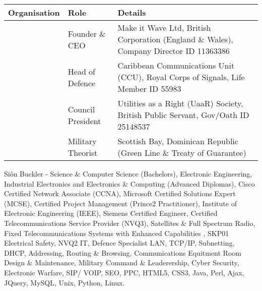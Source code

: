 \documentclass[letterpaper,10pt,openany,oneside,english]{sphinxmanual}
\begin{document}
\begin{savenotes}\sphinxattablestart
\centering
\begin{tabulary}{\linewidth}[t]{|T|T|T|}
\hline
\sphinxstyletheadfamily 
Organisation
&\sphinxstyletheadfamily 
Role
&\sphinxstyletheadfamily 
Details
\\
\hline
\noindent{}
&
Founder \& CEO
&
Make it Wave Ltd, British Corporation (England \& Wales), Company Director ID 11363386
\\
\hline
\noindent{}
&
Head of Defence
&
Caribbean Communications Unit (CCU), Royal Corps of Signals, Life Member ID 55983
\\
\hline
\noindent{}
&
Council President
&
Utilities as a Right (UaaR) Society, British Public Servant, Gov/Oath ID 25148537
\\
\hline
\noindent{}
&
Military Theorist
&
Scottish Bay, Dominican Republic (Green Line \& Treaty of Guarantee)
\\
\hline
\end{tabulary}
\par
\sphinxattableend\end{savenotes}

 Siôn Buckler - Science \& Computer Science (Bachelors), Electronic Engineering, Industrial Electronics and Electronics \& Computing (Advanced Diplomas), Cisco Certified Network Associate (CCNA), Microsoft Certified Solutions Expert (MCSE), Certified Project Management (Prince2 Practitioner), Institute of Electronic Engineering (IEEE), Siemens Certified Engineer, Certified Telecommunications Service Provider (NVQ3), Satellites \& Full Spectrum Radio, Fixed Telecommunications Systems with Enhanced Capabilities , SKP01 Electrical Safety, NVQ2 IT, Defence Specialist LAN, TCP/IP, Subnetting, DHCP, Addressing, Routing \& Browsing, Communications Equitment Room Design \& Maintenance, Military Command \& Leaderership,  Cyber Security, Electronic Warfare, SIP/ VOIP, SEO, PPC, HTML5, CSS3, Java, Perl, Ajax, JQuery, MySQL, Unix, Python, Linux.



\renewcommand{\indexname}{Index}
\printindex
\end{document}
